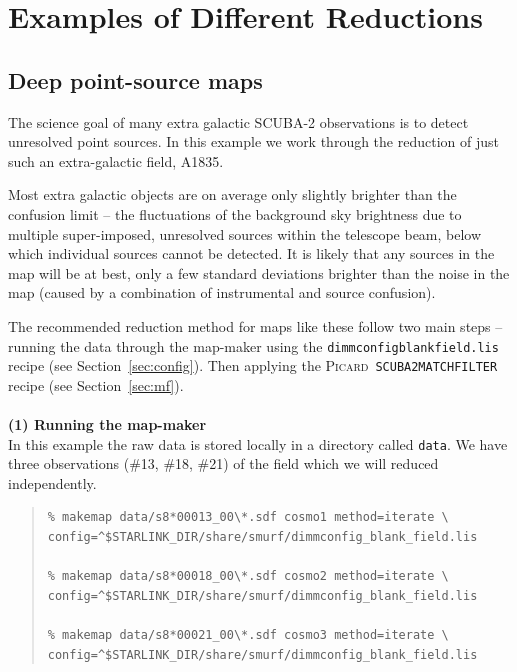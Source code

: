 \documentclass[twoside,11pt]{article}
\newcommand{\htmlref}[2]{#1}
\newcommand{\latexhtml}[2]{#1}
\newcommand{\xref}[3]{#1}
\newcommand{\xlabel}[1]{}
\renewcommand{\_}{\texttt{\symbol{95}}}
\newenvironment{myquote}{\begin{quote}\begin{small}}{\end{small}\end{quote}}
\newcommand{\picard}{\xref{\textsc{Picard}}{sun265}{}}
\newcommand{\cref}[3]{\latexhtml{#1~\ref{#2}}{\htmlref{#3}{#2}}}
\begin{document}
\clearpage
\section{\xlabel{Examples}Examples of Different Reductions}
\label{sec:eg}

\subsection{\xlabel{Cosmology}Deep point-source maps}
\label{sec:cosmology}

The science goal of many extra galactic SCUBA-2 observations is to
detect unresolved point sources. In this example we work through the
reduction of just such an extra-galactic field, A1835.

Most extra galactic objects are on average only slightly brighter than
the confusion limit -- the fluctuations of the background sky
brightness due to multiple super-imposed, unresolved sources within
the telescope beam, below which individual sources cannot be detected.
It is likely that any sources in the map will be at best, only a few
standard deviations brighter than the noise in the map (caused by a
combination of instrumental and source confusion).

The recommended reduction method for maps like these follow two main
steps -- running the data through the map-maker using the
\texttt{dimmconfig\_blank\_field.lis} recipe (see
\cref{Section}{sec:config}{Specialised configuration files}). Then
applying the \picard\ \texttt{SCUBA2\_MATCH\_FILTER} recipe (see
\cref{Section}{sec:mf}{Point-source extraction}).
\\ \\
\textbf{(1) Running the map-maker}\\
In this example the raw data is stored locally in a directory called
\texttt{data}. We have three observations (\#13, \#18, \#21) of the field
which we will reduced independently.

\begin{myquote}
\begin{verbatim}
% makemap data/s8*00013_00\*.sdf cosmo1 method=iterate \
config=^$STARLINK_DIR/share/smurf/dimmconfig_blank_field.lis

% makemap data/s8*00018_00\*.sdf cosmo2 method=iterate \
config=^$STARLINK_DIR/share/smurf/dimmconfig_blank_field.lis

% makemap data/s8*00021_00\*.sdf cosmo3 method=iterate \
config=^$STARLINK_DIR/share/smurf/dimmconfig_blank_field.lis

\end{verbatim}
\end{myquote}
\end{document}
